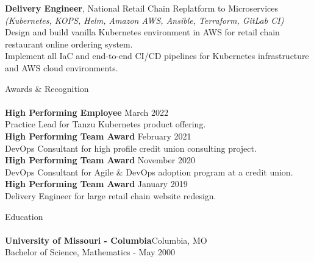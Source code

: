 \documentclass[letterpaper]{article}
\newcommand{\lineunder} {
    \vspace*{-8pt} \\
    \hspace*{-18pt} \hrulefill \\
}
\newcommand{\header} [1] {
    {\hspace*{-18pt}\vspace*{6pt} #1}
    \vspace*{-6pt} \lineunder
}
\begin{document}
{\textbf{Delivery Engineer}, National Retail Chain Replatform to Microservices} \nopagebreak \\
{\sl (Kubernetes, KOPS, Helm, Amazon AWS, Ansible, Terraform, GitLab CI)} \nopagebreak \\
Design and build vanilla Kubernetes environment in AWS for retail chain
  restaurant online ordering system.\\
Implement all IaC and end-to-end CI/CD pipelines for Kubernetes infrastructure
  and AWS cloud environments.\\
\vspace*{2mm}

\header{Awards \& Recognition}

\textbf{High Performing Employee} \hfill March 2022\\
\hspace*{5mm} Practice Lead for Tanzu Kubernetes product offering.\\
\vspace*{2mm}
\textbf{High Performing Team Award} \hfill February 2021\\
\hspace*{5mm} DevOps Consultant for high profile credit union consulting project.\\
\vspace*{2mm}
\textbf{High Performing Team Award} \hfill November 2020\\
\hspace*{5mm} DevOps Consultant for Agile \& DevOps adoption program at a credit union.\\
\vspace*{2mm}
\textbf{High Performing Team Award} \hfill January 2019\\
\hspace*{5mm} Delivery Engineer for large retail chain website redesign.\\
\vspace*{2mm}

\header{Education}
\textbf{University of Missouri - Columbia}\hfill Columbia, MO\\
Bachelor of Science, Mathematics \hfill  - May 2000\\
\vspace{2mm}
\end{document}
